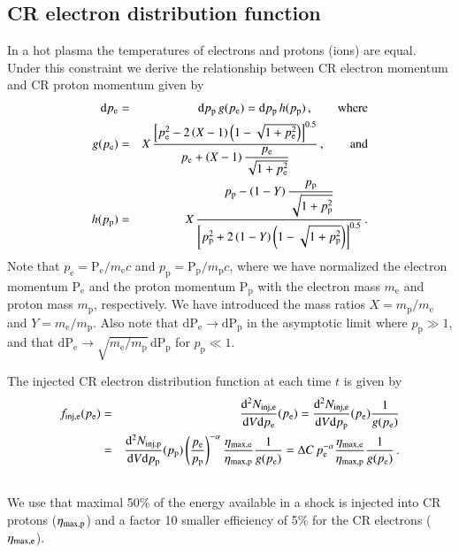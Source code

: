 \documentclass[useAMS,usenatbib]{mn2e}
\newcommand{\dd}{\mathrm{d}}
\newcommand{\p}{\mathrm{p}}
\newcommand{\Pp}{\mathrm{P}_\mathrm{p}}
\newcommand{\Pe}{\mathrm{P}_\mathrm{e}}
\newcommand{\pp}{p_\mathrm{p}}
\newcommand{\pe}{p_\mathrm{e}}
\newcommand{\e}{\mathrm{e}}
\begin{document}
\subsection{CR electron distribution function} 
In a hot plasma the temperatures of electrons and protons (ions) are
equal. Under this constraint we derive the relationship between CR
electron momentum and CR proton momentum given by
\begin{eqnarray}
  \label{eq:pe_pp}
\dd \pe &=& \dd \pp \,g(\pe) =  \dd \pp \,h(\pp)\,,\qquad \rmn{where}\\
g(\pe) &=& X \,\frac{\left[\pe^2-2\left(X-1\right)\left(1-\sqrt{1+\pe^2}\right)\right]^{0.5}}{\displaystyle\pe+\left(X-1\right)\frac{\pe}{\sqrt{1+\pe^2}}}\,,\qquad \rmn{and}\\
h(\pp) &=& X \,\frac{\displaystyle\pp-\left(1-Y\right)\frac{\pp}{\sqrt{1+\pp^2}}}{\left[\pp^2+2\left(1-Y\right)\left(1-\sqrt{1+\pp^2}\right)\right]^{0.5}}\,.\\
\end{eqnarray}
Note that $\pe = \Pe/m_\e c$ and $\pp = \Pp/m_\p c$, where we have
normalized the electron momentum $\Pe$ and the proton momentum $\Pp$
with the electron mass $m_\e$ and proton mass $m_\p$, respectively. We
have introduced the mass ratios $X=m_\p/m_\e$ and $Y=m_\e/m_\p$. Also
note that $\dd \Pe\rightarrow \dd \Pp$ in the asymptotic limit where
$\pp\gg 1$, and that $\dd \Pe\rightarrow \sqrt{m_\e / m_\p}\,\dd \Pp$ for
$\pp\ll 1$. 

The injected CR electron distribution function at each time $t$ is
given by
\begin{eqnarray}
  \label{eq:f_inj_e}
  f_\rmn{inj,e}(p_\e) &=&  \frac{\dd^2 N_\rmn{inj,e}}{\dd V \dd p_\e}(p_\e) = 
\frac{\dd^2 N_\rmn{inj,e}}{\dd V \dd p_\p}(p_\e)\frac{1}{g(p_\e)} \nonumber\\
&=& \frac{\dd^2 N_\rmn{inj,p}}{\dd V \dd p_\p}(p_\p)
\left(\frac{p_\e}{p_\p}\right)^{-\alpha}\frac{\eta_\rmn{max,e}}{\eta_\rmn{max,p}}\frac{1}{g(p_\e)} = 
\Delta C\,p_\e^{-\alpha}\frac{\eta_\rmn{max,e}}{\eta_\rmn{max,p}}\frac{1}{g(p_\e)}\,.
 \nonumber\\
&&
\end{eqnarray}
We use that maximal 50\% of the energy available in a shock is
injected into CR protons ($\eta_{\mathrm{max,p}}$) and a factor 10 smaller
efficiency of 5\% for the CR electrons ($\eta_{\mathrm{max,e}}$).
\end{document}
